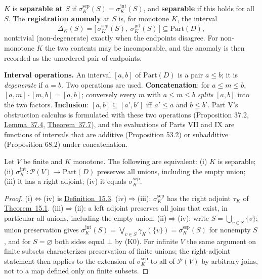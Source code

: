\begin{thmdef}

\(K\) is \textbf{separable at \(S\)} if \(\sigma^{\mathrm{sep}}_K(S)=\sigma^{\mathrm{jnt}}_K(S)\), and \textbf{separable} if this holds for all \(S\). The \textbf{registration anomaly} at \(S\) is, for monotone \(K\), the interval
\[
\Delta_K(S)=\big[\,\sigma^{\mathrm{sep}}_K(S),\ \sigma^{\mathrm{jnt}}_K(S)\,\big]\subseteq\mathrm{Part}(D),
\]
nontrivial (non-degenerate) exactly when the endpoints disagree. For non-monotone \(K\) the two contents may be incomparable, and the anomaly is then recorded as the unordered pair of endpoints.

\textbf{Interval operations.} An interval \([a,b]\) of \(\mathrm{Part}(D)\) is a pair \(a\le b\); it is \emph{degenerate} if \(a=b\). Two operations are used. \textbf{Concatenation}: for \(a\le m\le b\), \([a,m]\cdot[m,b]=[a,b]\); conversely every \(m\) with \(a\le m\le b\) \emph{splits} \([a,b]\) into the two factors. \textbf{Inclusion}: \([a,b]\subseteq[a',b']\) iff \(a'\le a\) and \(b\le b'\). Part V's obstruction calculus is formulated with these two operations (Proposition 37.2, \hyperlink{stmt:37.4}{Lemma~37.4}, \hyperlink{stmt:37.7}{Theorem~37.7}), and the evaluations of Parts VII and IX are functions of intervals that are additive (Proposition 53.2) or subadditive (Proposition 68.2) under concatenation.
\end{thmdef}

\begin{thmplain}

Let \(V\) be finite and \(K\) monotone. The following are equivalent: (i) \(K\) is separable; (ii) \(\sigma_K^{\mathrm{jnt}}:\mathcal P(V)\to\mathrm{Part}(D)\) preserves all unions, including the empty union; (iii) it has a right adjoint; (iv) it equals \(\sigma_K^{\mathrm{sep}}\).
\end{thmplain}

\begin{proof}

(i)\(\Leftrightarrow\)(iv) is \hyperlink{stmt:15.3}{Definition~15.3}. (iv)\(\Rightarrow\)(iii): \(\sigma^{\mathrm{sep}}_K\) has the right adjoint \(\tau_K\) of \hyperlink{stmt:15.1}{Theorem~15.1}. (iii)\(\Rightarrow\)(ii): a left adjoint preserves all joins that exist, in particular all unions, including the empty union. (ii)\(\Rightarrow\)(iv): write \(S=\bigcup_{v\in S}\{v\}\); union preservation gives \(\sigma^{\mathrm{jnt}}_K(S)=\bigvee_{v\in S}\gamma_K(\{v\})=\sigma^{\mathrm{sep}}_K(S)\) for nonempty \(S\), and for \(S=\varnothing\) both sides equal \(\bot\) by (K0). For infinite \(V\) the same argument on finite subsets characterizes preservation of finite unions; the right-adjoint statement then applies to the extension of \(\sigma^{\mathrm{sep}}_K\) to all of \(\mathcal P(V)\) by arbitrary joins, not to a map defined only on finite subsets.
\end{proof}

